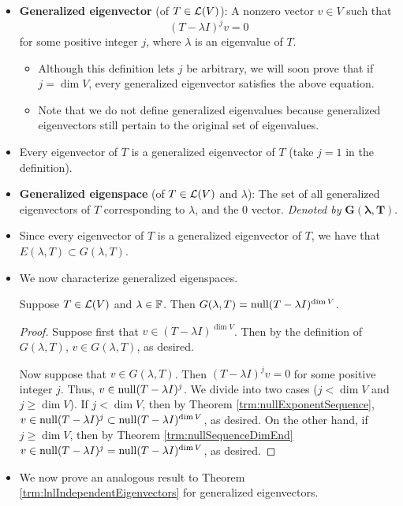 \documentclass[../main.tex]{subfiles}
\begin{document}
\begin{itemize}
    \item \textbf{Generalized eigenvector} (of $T\in\mathcal{L}(V)$): A nonzero vector $v\in V$ such that
    \begin{equation*}
        (T-\lambda I)^jv = 0
    \end{equation*}
    for some positive integer $j$, where $\lambda$ is an eigenvalue of $T$.
    \begin{itemize}
        \item Although this definition lets $j$ be arbitrary, we will soon prove that if $j=\dim V$, every generalized eigenvector satisfies the above equation.
        \item Note that we do not define generalized eigenvalues because generalized eigenvectors still pertain to the original set of eigenvalues.
    \end{itemize}
    \item Every eigenvector of $T$ is a generalized eigenvector of $T$ (take $j=1$ in the definition).
    \item \textbf{Generalized eigenspace} (of $T\in\mathcal{L}(V)$ and $\lambda$): The set of all generalized eigenvectors of $T$ corresponding to $\lambda$, and the 0 vector. \emph{Denoted by} $\bm{G(\lambda,T)}$.
    \item Since every eigenvector of $T$ is a generalized eigenvector of $T$, we have that $E(\lambda,T)\subset G(\lambda,T)$.
    \item We now characterize generalized eigenspaces.
    \begin{theorem}\label{trm:generalizedEigenspaces}
        Suppose $T\in\mathcal{L}(V)$ and $\lambda\in\mathbb{F}$. Then $G(\lambda,T)=\operatorname{null}(T-\lambda I)^{\dim V}$.
        \begin{proof}
            Suppose first that $v\in(T-\lambda I)^{\dim V}$. Then by the definition of $G(\lambda,T)$, $v\in G(\lambda,T)$, as desired.\par
            Now suppose that $v\in G(\lambda,T)$. Then $(T-\lambda I)^jv=0$ for some positive integer $j$. Thus, $v\in\operatorname{null}(T-\lambda I)^j$. We divide into two cases ($j<\dim V$ and $j\geq\dim V$). If $j<\dim V$, then by Theorem \ref{trm:nullExponentSequence}, $v\in\operatorname{null}(T-\lambda I)^j\subset\operatorname{null}(T-\lambda I)^{\dim V}$, as desired. On the other hand, if $j\geq\dim V$, then by Theorem \ref{trm:nullSequenceDimEnd} $v\in\operatorname{null}(T-\lambda I)^j=\operatorname{null}(T-\lambda I)^{\dim V}$, as desired.
        \end{proof}
    \end{theorem}
    \item We now prove an analogous result to Theorem \ref{trm:lnlIndependentEigenvectors} for generalized eigenvectors.

\end{itemize}
\end{document}
